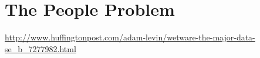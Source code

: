\chapter{The People Problem}
\url{http://www.huffingtonpost.com/adam-levin/wetware-the-major-data-se_b_7277982.html}

